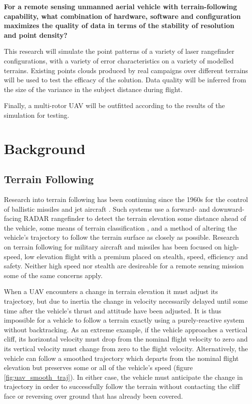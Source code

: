 \documentclass[10pt,a4paper]{report}
\begin{document}
\textbf{For a remote sensing unmanned aerial vehicle with terrain-following capability, what combination of hardware, software and configuration maximizes the quality of data in terms of the stability of resolution and point density?}

This research will simulate the point patterns of a variety of laser rangefinder configurations, with a variety of error characteristics on a variety of modelled terrains. Existing points clouds produced by real campaigns over different terrains will be used to test the efficacy of the solution. Data quality will be inferred from the size of the variance in the subject distance during flight.

Finally, a multi-rotor UAV will be outfitted according to the results of the simulation for testing.

\section{Background}

\subsection{Terrain Following}

Research into terrain following has been continuing since the 1960s for the control of ballistic missiles and jet aircraft \cite{KRACHMALNICK1968,Starling1971,Cunningham1980}. Such systems use a forward- and downward-facing RADAR rangefinder to detect the terrain elevation some distance ahead of the vehicle, some means of terrain classification \cite{Cunningham1980}, and a method of altering the vehicle's trajectory to follow the terrain surface as closely as possible. Research on terrain following for military aircraft and missiles has been focused on high-speed, low elevation flight with a premium placed on stealth, speed, efficiency and safety. Neither high speed nor stealth are desireable for a remote sensing mission some of the same concerns apply. 

When a UAV encounters a change in terrain elevation it must adjust its trajectory, but due to inertia the change in velocity necessarily delayed until some time after the vehicle's thrust and attitude have been adjusted. It is thus impossible for a vehicle to follow a terrain exactly using a purely-reactive system without backtracking. As an extreme example, if the vehicle approaches a vertical cliff, its horizontal velocity must drop from the nominal flight velocity to zero and its vertical velocity must change from zero to the flight velocity. Alternatively, the vehicle can follow a smoothed trajectory which departs from the nominal flight elevation but preserves some or all of the vehicle's speed (figure \ref{fig:uav_smooth_traj}). In either case, the vehicle must anticipate the change in trajectory in order to successfully follow the terrain without contacting the cliff face or reversing over ground that has already been covered.
\end{document}

